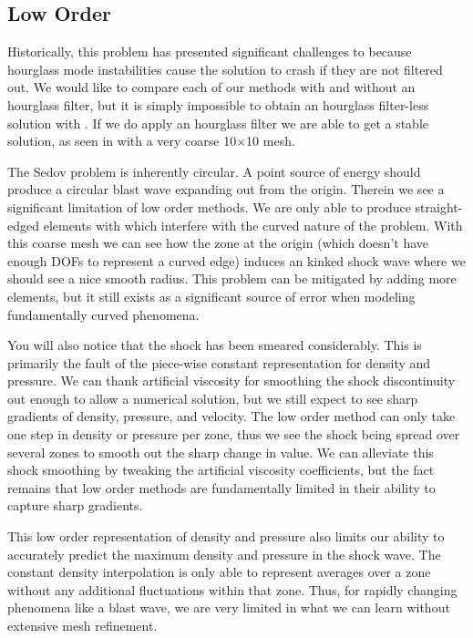\subsection{Low Order \texorpdfstring{}{Q1-Q0}}
Historically, this problem has presented significant challenges to  because hourglass mode instabilities cause the solution to crash if they are not filtered out. We would like to compare each of our methods with and without an hourglass filter, but it is simply impossible to obtain an hourglass filter-less solution with . If we do apply an hourglass filter we are able to get a stable solution, as seen in with a very coarse 10$\times$10 mesh.

The Sedov problem is inherently circular. A point source of energy should produce a circular blast wave expanding out from the origin. Therein we see a significant limitation of low order methods. We are only able to produce straight-edged elements with  which interfere with the curved nature of the problem. With this coarse mesh we can see how the zone at the origin (which doesn't have enough DOFs to represent a curved edge) induces an kinked shock wave where we should see a nice smooth radius. This problem can be mitigated by adding more elements, but it still exists as a significant source of error when modeling fundamentally curved phenomena.

You will also notice that the shock has been smeared considerably. This is primarily the fault of the piece-wise constant representation for density and pressure. We can thank artificial viscosity for smoothing the shock discontinuity out enough to allow a numerical solution, but we still expect to see sharp gradients of density, pressure, and velocity. The low order method can only take one step in density or pressure per zone, thus we see the shock being spread over several zones to smooth out the sharp change in value. We can alleviate this shock smoothing by tweaking the artificial viscosity coefficients, but the fact remains that low order methods are fundamentally limited in their ability to capture sharp gradients.

This low order representation of density and pressure also limits our ability to accurately predict the maximum density and pressure in the shock wave. The constant density interpolation is only able to represent averages over a zone without any additional fluctuations within that zone. Thus, for rapidly changing phenomena like a blast wave, we are very limited in what we can learn without extensive mesh refinement.

